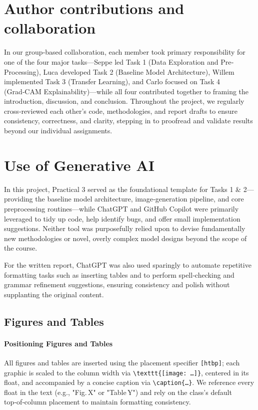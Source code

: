 \documentclass[conference]{IEEEtran}
\begin{document}
\section{Author contributions and collaboration}

In our group‐based collaboration, each member took primary responsibility for one of the four major tasks—Seppe led Task 1 (Data Exploration and Pre‐Processing), Luca developed Task 2 (Baseline Model Architecture), Willem implemented Task 3 (Transfer Learning), and Carlo focused on Task 4 (Grad‑CAM Explainability)—while all four contributed together to framing the introduction, discussion, and conclusion. Throughout the project, we regularly cross‐reviewed each other’s code, methodologies, and report drafts to ensure consistency, correctness, and clarity, stepping in to proofread and validate results beyond our individual assignments.

\section{Use of Generative AI}

In this project, Practical 3 served as the foundational template for Tasks 1 \& 2—providing the baseline model architecture, image‐generation pipeline, and core preprocessing routines—while ChatGPT and GitHub Copilot were primarily leveraged to tidy up code, help identify bugs, and offer small implementation suggestions. Neither tool was purposefully relied upon to devise fundamentally new methodologies or novel, overly complex model designs beyond the scope of the course.

For the written report, ChatGPT was also used sparingly to automate repetitive formatting tasks such as inserting tables and to perform spell‑checking and grammar refinement suggestions, ensuring consistency and polish without supplanting the original content.

\subsection{Figures and Tables}

\paragraph{Positioning Figures and Tables}

All figures and tables are inserted using the placement specifier \verb|[htbp]|; each graphic is scaled to the column width via
\verb|\texttt{[image: …]}|, centered in its float, and accompanied by a concise caption via \verb|\caption{…}|. We reference every float in the text (e.g., "Fig. X" or "Table Y") and rely on the class’s default top‑of‑column placement to maintain formatting consistency.
\end{document}
